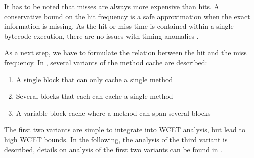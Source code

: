 It has to be noted that misses are always more expensive than hits. A
conservative bound on the hit frequency is a safe approximation when
the exact information is missing. As the hit or miss time is
contained within a single bytecode execution, there are no issues
with timing anomalies \cite{829103}.


As a next step, we have to formulate the relation between the hit and
the miss frequency. In \cite{jop:jtres_cache}, several variants of
the method cache are described:
\begin{enumerate}
    \item A single block that can only cache a single method
    \item Several blocks that each can cache a single method
    \item A variable block cache where a method can span several
        blocks
\end{enumerate}

The first two variants are simple to integrate into WCET analysis,
but lead to high WCET bounds. In the following, the analysis of the
third variant is described, details on analysis of the first two
variants can be found in \cite{jop:wcet:jtres06}.


%


